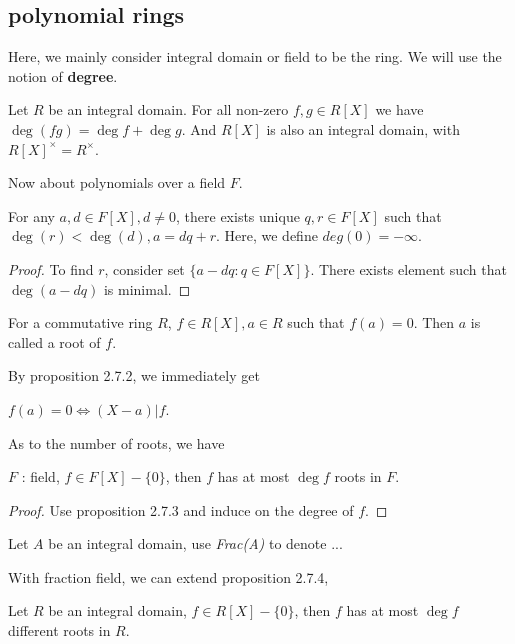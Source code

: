 \documentclass[11pt,fleqn]{book} %
\begin{document}
\begin{CJK}{UTF8}{gkai}
\section{polynomial rings}
Here, we mainly consider integral domain or field to be the ring. We will use the notion of {\bf degree}.
\begin{lemma}
	Let $R$ be an integral domain. For all non-zero $f, g \in R[X]$ we have $\deg (fg) = \deg f + \deg g$. And $R[X]$ is also an integral domain, with $R[X]^{\times} = R^{\times}$.
\end{lemma}

Now about polynomials over a field $F$.
\begin{proposition}
	[带余除法] For any $a,d \in F[X], d \neq 0$, there exists unique $q,r \in F[X]$ such that $\deg (r) <\deg (d), a = dq + r$. Here, we define $deg (0) = -\infty$.
\end{proposition}
\begin{proof}
	To find $r$, consider set $\{a - dq : q \in F[X]\}$. There exists element such that $\deg(a - dq)$ is minimal.	
\end{proof}

\begin{definition}
	[root] For a commutative ring $R$, $f \in R[X], a \in R$ such that $f(a) = 0$. Then $a$ is called a root of $f$.
\end{definition}

By proposition 2.7.2, we immediately get 
\begin{proposition}
	$f(a) = 0 \iff (X - a) | f$.
\end{proposition}

As to the number of roots, we have 
\begin{proposition}
	$F$ : field, $f \in F[X]-\{0\}$, then $f$ has at most $\deg f$ roots in $F$.
\end{proposition}
\begin{proof}
	Use proposition 2.7.3 and induce on the degree of $f$.
\end{proof}

\begin{definition}
	 Let $A$ be an integral domain, use {\it Frac(A)} to denote ... 
\end{definition}

With fraction field, we can extend proposition 2.7.4,
\begin{lemma}
	Let $R$ be an integral domain, $f \in R[X] - \{0\}$, then $f$ has at most $\deg f$ different roots in $R$.	
\end{lemma}


\end{CJK}
\end{document}
